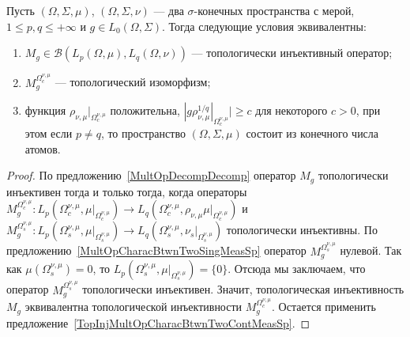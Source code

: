 \begin{proposition}\label{TopInjMultOpCharacBtwnTwoMeasSp} Пусть
$(\Omega,\Sigma,\mu)$, $(\Omega,\Sigma,\nu)$ --- два $\sigma$-конечных
пространства с мерой, $1\leq p,q\leq +\infty$ и $g\in L_0(\Omega,\Sigma)$. Тогда
следующие условия эквивалентны:

\begin{enumerate}[label = (\roman*)]
    \item $M_g\in\mathcal{B}(L_p(\Omega,\mu), L_q(\Omega,\nu))$ --- топологически
    инъективный оператор;

    \item $M_g^{\Omega_c^{\nu,\mu}}$ --- топологический изоморфизм;

    \item функция $\rho_{\nu,\mu}|_{\Omega_c^{\nu,\mu}}$ положительна, $|g
    \rho_{\nu,\mu}^{1/q}|_{\Omega_c^{\nu,\mu}}|\geq c$ для некоторого $c>0$, 
    при этом если $p\neq q$, то пространство $(\Omega,\Sigma,\mu)$ 
    состоит из конечного числа атомов.
\end{enumerate}
\end{proposition}
\begin{proof}
По предложению~\ref{MultOpDecompDecomp} оператор $M_g$ топологически инъективен
тогда и только тогда, когда операторы
$M_g^{\Omega_c^{\nu,\mu}}:L_p(\Omega_c^{\nu,\mu},\mu|_{\Omega_c^{\nu,\mu}})\to
L_q(\Omega_c^{\nu,\mu},\rho_{\nu,\mu} \mu|_{\Omega_c^{\nu,\mu}})$ и
$M_g^{\Omega_s^{\nu,\mu}}:L_p(\Omega_s^{\nu,\mu},\mu|_{\Omega_s^{\nu,\mu}})\to
L_q(\Omega_s^{\nu,\mu},\nu_s|_{\Omega_s^{\nu,\mu}})$  топологически инъективны.
По предложению~\ref{MultOpCharacBtwnTwoSingMeasSp} оператор
$M_g^{\Omega_s^{\nu,\mu}}$ нулевой. Так как $\mu(\Omega_s^{\nu,\mu})=0$, то
$L_p(\Omega_s^{\nu,\mu},\mu|_{\Omega_s^{\nu,\mu}})= \{0 \}$. Отсюда мы
заключаем, что оператор $M_g^{\Omega_s^{\nu,\mu}}$ топологически инъективен.
Значит, топологическая инъективность $M_g$ эквивалентна топологической
инъективности  $M_g^{\Omega_c^{\nu,\mu}}$. Остается применить
предложение~\ref{TopInjMultOpCharacBtwnTwoContMeasSp}.
\end{proof}

